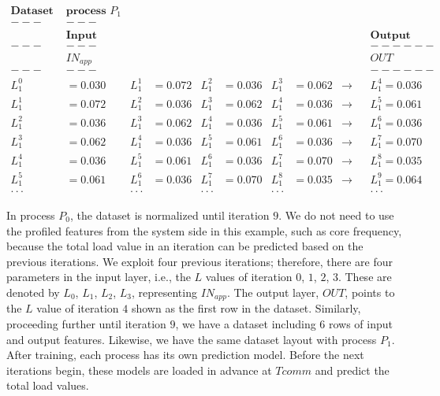 {\small
\begin{align*}
\textbf{Dataset on } &\textbf{process $P_{1}$} \\
   ---&---	      	\\
&\textbf{Input}	& &	&	& & & & &	&\textbf{Output} \\
   ---&---  & & & &	& & & & &------	\\
	&IN_{app} & & & & & & & & &OUT    \\
   ---&---  & &	& & & & & & &------	\\
L^{0}_{1} &=0.030  &  L^{1}_{1} &=0.072  &  L^{2}_{1} &=0.036  &  L^{3}_{1} &=0.062	& \rightarrow &	 &L^{4}_{1} =0.036  \\
L^{1}_{1} &=0.072  &  L^{2}_{1} &=0.036  &  L^{3}_{1} &=0.062  &  L^{4}_{1} &=0.036	& \rightarrow &	 &L^{5}_{1} =0.061  \\
L^{2}_{1} &=0.036  &  L^{3}_{1} &=0.062  &  L^{4}_{1} &=0.036  &  L^{5}_{1} &=0.061	& \rightarrow &	 &L^{6}_{1} =0.036  \\
L^{3}_{1} &=0.062  &  L^{4}_{1} &=0.036  &  L^{5}_{1} &=0.061  &  L^{6}_{1} &=0.036	& \rightarrow &	 &L^{7}_{1} =0.070  \\
L^{4}_{1} &=0.036  &  L^{5}_{1} &=0.061  &  L^{6}_{1} &=0.036  &  L^{7}_{1} &=0.070	& \rightarrow &	 &L^{8}_{1} =0.035  \\
L^{5}_{1} &=0.061  &  L^{6}_{1} &=0.036  &  L^{7}_{1} &=0.070  &  L^{8}_{1} &=0.035	& \rightarrow &	 &L^{9}_{1} =0.064  \\
\cdot\cdot\cdot & & \cdot\cdot\cdot & & \cdot\cdot\cdot & & \cdot\cdot\cdot & & & & \cdot\cdot\cdot 
\end{align*}
}%

In process $P_{0}$, the dataset is normalized until iteration $9$. We do not need to use the profiled features from the system side in this example, such as core frequency, because the total load value in an iteration can be predicted based on the previous iterations. We exploit four previous iterations; therefore, there are four parameters in the input layer, i.e., the $L$ values of iteration $0$, $1$, $2$, $3$. These are denoted by $L_{0}$, $L_{1}$, $L_{2}$, $L_{3}$, representing $IN_{app}$. The output layer, $OUT$, points to the $L$ value of iteration $4$ shown as the first row in the dataset. Similarly, proceeding further until iteration $9$, we have a dataset including $6$ rows of input and output features. Likewise, we have the same dataset layout with process $P_{1}$.\\

After training, each process has its own prediction model. Before the next iterations begin, these models are loaded in advance at $Tcomm$ and predict the total load values.\\

